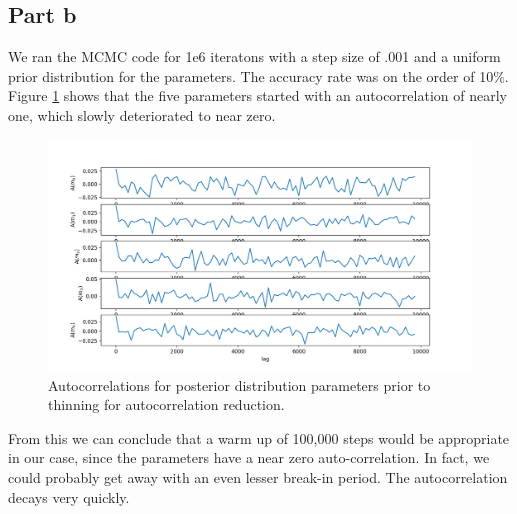 \documentclass{article}
\begin{document}




\subsection*{Part b}
We ran the MCMC code for 1e6 iteratons with a step size of .001 and a uniform prior distribution for the parameters. The accuracy rate was on the order of 10\%. Figure \ref{fig:2b} shows that the five parameters started with an autocorrelation of nearly one, which slowly deteriorated to near zero. 
\begin{figure}[!h]
    \centering
    \includegraphics[width=\textwidth]{AutoCorr.png}
    \caption{Autocorrelations for posterior distribution parameters prior to thinning for autocorrelation reduction.}
    \label{fig:2b}
\end{figure}
From this we can conclude that a warm up of 100,000 steps would be appropriate in our case, since the parameters have a near zero auto-correlation. In fact, we could probably get away with an even lesser break-in period. The autocorrelation decays very quickly. 
\end{document}
